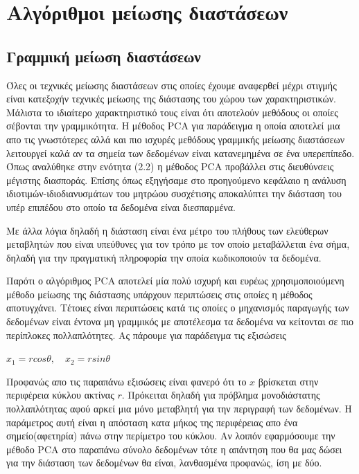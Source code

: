 
\chapter{Αλγόριθμοι μείωσης διαστάσεων}

\section{Γραμμική μείωση διαστάσεων}
\par
Όλες οι τεχνικές μείωσης διαστάσεων στις οποίες έχουμε αναφερθεί μέχρι στιγμής είναι κατεξοχήν τεχνικές μείωσης της διάστασης του χώρου των χαρακτηριστικών. Μάλιστα το ιδιαίτερο χαρακτηριστικό τους είναι ότι αποτελούν μεθόδους οι οποίες σέβονται την γραμμικότητα. Η μέθοδος \textlatin{PCA}\textlatin{\cite{pca}} για παράδειγμα η οποία αποτελεί μια απο τις γνωστότερες αλλά και πιο ισχυρές μεθόδους γραμμικής μείωσης διαστάσεων λειτουργεί καλά αν τα σημεία των δεδομένων είναι κατανεμημένα σε ένα υπερεπίπεδο. Όπως αναλύθηκε στην ενότητα (2.2) η μέθοδος \textlatin{PCA}\textlatin{\cite{pca}} προβάλλει στις διευθύνσεις μέγιστης διασποράς. Επίσης όπως εξηγήσαμε στο προηγούμενο κεφάλαιο η ανάλυση ιδιοτιμών-ιδιοδιανυσμάτων του μητρώου συσχέτισης αποκαλύπτει την διάσταση του υπέρ επιπέδου στο οποίο τα δεδομένα είναι διεσπαρμένα. 
\par
Με άλλα λόγια δηλαδή η διάσταση είναι ένα μέτρο του πλήθους των ελεύθερων μεταβλητών που είναι υπεύθυνες για τον τρόπο με τον οποίο μεταβάλλεται ένα σήμα, δηλαδή για την πραγματική πληροφορία την οποία κωδικοποιούν τα δεδομένα. 
\par
Παρότι ο αλγόριθμος \textlatin{PCA}\textlatin{\cite{pca}} αποτελεί μία πολύ ισχυρή και ευρέως χρησιμοποιούμενη μέθοδο μείωσης της διάστασης υπάρχουν περιπτώσεις στις οποίες η μέθοδος αποτυγχάνει. Τέτοιες είναι περιπτώσεις κατά τις οποίες ο μηχανισμός παραγωγής των δεδομένων είναι έντονα μη γραμμικός με αποτέλεσμα τα δεδομένα να κείτονται σε πιο περίπλοκες πολλαπλότητες. Ας πάρουμε για παράδειγμα τις εξισώσεις \\
\begin{center}
$x_{1}=r cos\theta, \quad x_{2}=rsin\theta$
\end{center}
Προφανώς απο τις παραπάνω εξισώσεις είναι φανερό ότι το $x$ βρίσκεται στην περιφέρεια κύκλου ακτίνας $r$. Πρόκειται δηλαδή για πρόβλημα μονοδιάστατης πολλαπλότητας αφού αρκεί μια μόνο μεταβλητή για την περιγραφή των δεδομένων. Η παράμετρος αυτή είναι η απόσταση κατα μήκος της περιφέρειας απο ένα σημείο(αφετηρία) πάνω στην περίμετρο του κύκλου. Αν λοιπόν εφαρμόσουμε την μέθοδο \textlatin{PCA}\textlatin{\cite{pca}} στο παραπάνω σύνολο δεδομένων τότε η απάντηση που θα μας δώσει για την διάσταση των δεδομένων θα είναι, λανθασμένα προφανώς, ίση με δύο. 
